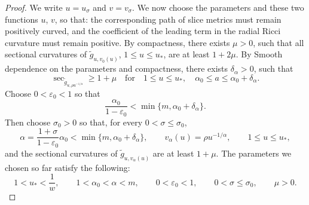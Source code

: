 \documentclass[11pt,reqno]{amsart}
\theoremstyle{definition}
\numberwithin{equation}{section}
\begin{document}
\begin{proof}
We write \(u=u_\sigma\) and \(v=v_\sigma\).  We now choose the
parameters and these two functions $u$, $v$, so that: the corresponding path
of slice metrics must remain positively curved, and the coefficient of
the leading term in the radial Ricci curvature must remain positive.
By compactness, there exists $\mu>0$, such that all sectional curvatures of
$\widetilde g_{u,v_0(u)}$, $1\le u\le u_*$, are at least
$1+2\mu$.  By Smooth dependence on the parameters and compactness, there exists
\(\delta_\alpha>0\), such that
\[
 \sec_{\widetilde g_{u,\rho u^{-1/a}}}\geq1+\mu
 \quad\text{for}\quad
 1\leq u\leq u_*,\quad
 \alpha_0\leq a\leq\alpha_0+\delta_\alpha .
\]
Choose $0<\varepsilon_0<1$ so that
\[
 \frac{\alpha_0}{1-\varepsilon_0}
 <\min\{m,\alpha_0+\delta_\alpha\}.
\]
Then choose $\sigma_0>0$ so that, for every
$0<\sigma\le\sigma_0$,
\begin{equation}
\alpha=\frac{1+\sigma}{1-\varepsilon_0}\alpha_0
 <\min\{m,\alpha_0+\delta_\alpha\},
 \qquad
 v_\alpha(u)=\rho u^{-1/\alpha},\qquad 1\le u\le u_*,           \label{eq:unified-base-3-48}
\end{equation}
and the sectional curvatures of
$\widetilde g_{u,v_\alpha(u)}$ are at least $1+\mu$.  The parameters
we chosen so far satisfy the following:
\begin{equation}
1<u_*<\frac1w,\qquad
 1<\alpha_0<\alpha<m,\qquad
 0<\varepsilon_0<1,\qquad 0<\sigma\le\sigma_0,\qquad \mu>0.      \label{eq:unified-base-3-49}
\end{equation}


\end{proof}
\end{document}
